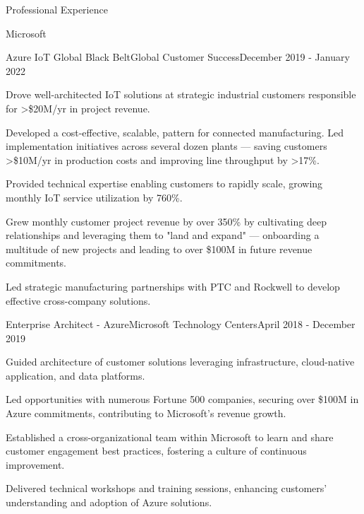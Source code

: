 \documentclass{resume} %
\begin{document}
\begin{rSection}{Professional Experience}
\begin{rCompany}{Microsoft}{}{}
    \begin{rSubSubsection}{Azure IoT Global Black Belt}{Global Customer Success}{December 2019 - January 2022}
        \item Drove well-architected IoT solutions at strategic industrial customers responsible for >\$20M/yr in project revenue. 
        \item Developed a cost-effective, scalable, pattern for connected manufacturing. Led implementation initiatives across several dozen plants --- saving customers >\$10M/yr in production costs and improving line throughput by >17\%. 
        \item Provided technical expertise enabling customers to rapidly scale, growing monthly IoT service utilization by 760\%.
        \item Grew monthly customer project revenue by over 350\% by cultivating deep relationships and leveraging them to "land and expand" --- onboarding a multitude of new projects and leading to over \$100M in future revenue commitments.\
        \item Led strategic manufacturing partnerships with PTC and Rockwell to develop effective cross-company solutions.
    \end{rSubSubsection}
    
    \begin{rSubSubsection}{Enterprise Architect - Azure}{Microsoft Technology Centers}{April 2018 - December 2019}
        \item Guided architecture of customer solutions leveraging infrastructure, cloud-native application, and data platforms.
        \item Led opportunities with numerous Fortune 500 companies, securing over \$100M in Azure commitments, contributing to Microsoft's revenue growth.
        \item Established a cross-organizational team within Microsoft to learn and share customer engagement best practices, fostering a culture of continuous improvement.
        \item Delivered technical workshops and training sessions, enhancing customers' understanding and adoption of Azure solutions.
    \end{rSubSubsection}
  \end{rCompany}


\end{rSection}
\end{document}
